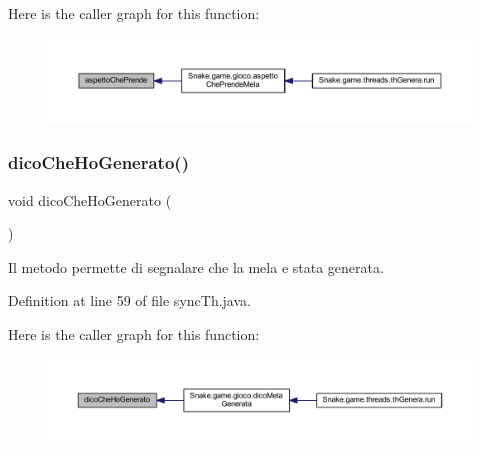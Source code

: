 Here is the caller graph for this function\+:
\nopagebreak
\begin{figure}[H]
\begin{center}
\leavevmode
\includegraphics[width=350pt]{class_snake_1_1game_1_1utility_1_1sync_th_a8e454b3430022fcccd7ecf338441c1bf_icgraph}
\end{center}
\end{figure}
\mbox{\label{class_snake_1_1game_1_1utility_1_1sync_th_a952f218c604508fb98a470f6a648a956}} 
\subsubsection{\texorpdfstring{dico\+Che\+Ho\+Generato()}{dicoCheHoGenerato()}}
{\footnotesize\ttfamily void dico\+Che\+Ho\+Generato (\begin{DoxyParamCaption}{ }\end{DoxyParamCaption})}



Il metodo permette di segnalare che la mela e\textquotesingle{} stata generata. 



Definition at line 59 of file sync\+Th.\+java.

Here is the caller graph for this function\+:
\nopagebreak
\begin{figure}[H]
\begin{center}
\leavevmode
\includegraphics[width=350pt]{class_snake_1_1game_1_1utility_1_1sync_th_a952f218c604508fb98a470f6a648a956_icgraph}
\end{center}
\end{figure}
\mbox{\label{class_snake_1_1game_1_1utility_1_1sync_th_a56a1409c7c23a1238719bd1dd4430fc7}} 
